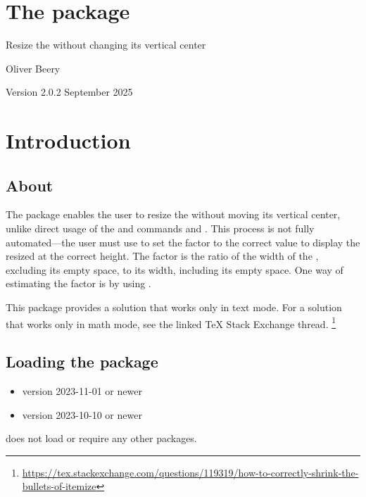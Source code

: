 \documentclass{beery}
\begin{document}
\section*{The  package}

Resize the  without changing its vertical center

Oliver Beery

Version 2.0.2 September 2025


\section{Introduction}
\label{sec:intro}

\subsection{About}
\label{subsec:about}

The  package enables the user to resize the  without moving its vertical center, unlike direct usage of the \LaTeXe{} and  commands  and .
This process is not fully automated---the user must use  to set the  factor to the correct value to display the resized  at the correct height.
The  factor is the ratio of the width of the , excluding its empty space, to its width, including its empty space.
One way of estimating the  factor is by using .

This package provides a solution that works only in text mode.
For a solution that works only in math mode, see the linked \TeX{} Stack Exchange thread.%
\footnote{\url{https://tex.stackexchange.com/questions/119319/how-to-correctly-shrink-the-bullets-of-itemize}}

\subsection{Loading the package}
\label{subsec:loading}

\begin{itemize}
  \item \LaTeXe{} version 2023-11-01 or newer
  \item {} version 2023-10-10 or newer
\end{itemize}

 does not load or require any other packages.
\end{document}
